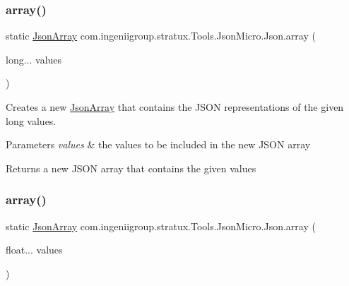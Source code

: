 \subsubsection{\texorpdfstring{array()}{array()}\hspace{0.1cm}{\footnotesize\ttfamily [3/7]}}
{\footnotesize\ttfamily static \hyperlink{classcom_1_1ingeniigroup_1_1stratux_1_1_tools_1_1_json_micro_1_1_json_array}{Json\+Array} com.\+ingeniigroup.\+stratux.\+Tools.\+Json\+Micro.\+Json.\+array (\begin{DoxyParamCaption}\item[{long...}]{values }\end{DoxyParamCaption})\hspace{0.3cm}{\ttfamily [static]}}

Creates a new \hyperlink{classcom_1_1ingeniigroup_1_1stratux_1_1_tools_1_1_json_micro_1_1_json_array}{Json\+Array} that contains the J\+S\+ON representations of the given {\ttfamily long} values.


\begin{DoxyParams}{Parameters}
{\em values} & the values to be included in the new J\+S\+ON array \\
\hline
\end{DoxyParams}
\begin{DoxyReturn}{Returns}
a new J\+S\+ON array that contains the given values 
\end{DoxyReturn}
\mbox{\label{classcom_1_1ingeniigroup_1_1stratux_1_1_tools_1_1_json_micro_1_1_json_a57bea0b51a57f8a4ddd8de173194e47f}} 
\subsubsection{\texorpdfstring{array()}{array()}\hspace{0.1cm}{\footnotesize\ttfamily [4/7]}}
{\footnotesize\ttfamily static \hyperlink{classcom_1_1ingeniigroup_1_1stratux_1_1_tools_1_1_json_micro_1_1_json_array}{Json\+Array} com.\+ingeniigroup.\+stratux.\+Tools.\+Json\+Micro.\+Json.\+array (\begin{DoxyParamCaption}\item[{float...}]{values }\end{DoxyParamCaption})\hspace{0.3cm}{\ttfamily [static]}}

